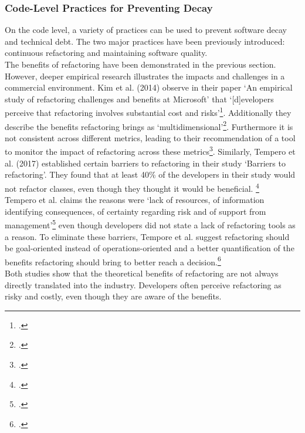 \subsubsection{Code-Level Practices for Preventing Decay}
On the code level, a variety of practices can be used to prevent software decay and technical debt. The two major practices have been previously introduced: continuous refactoring and maintaining software quality.\\
The benefits of refactoring have been demonstrated in the previous section. However, deeper empirical research illustrates the impacts and challenges in a commercial environment.
Kim et al. (2014) observe in their paper `An empirical study of refactoring challenges and benefits at Microsoft' that `[d]evelopers perceive that refactoring involves substantial cost and risks'\footcite[17]{kimEmpiricalStudyRefactoring2014}.
Additionally they describe the benefits refactoring brings as `multidimensional'\footcite[17]{kimEmpiricalStudyRefactoring2014}. Furthermore it is not consistent across different metrics, leading to their recommendation of a tool to monitor the impact of refactoring across these metrics\footcite[17]{kimEmpiricalStudyRefactoring2014}.
Similarly, Tempero et al. (2017) established certain barriers to refactoring in their study `Barriers to refactoring'. They found that at least 40\% of the developers in their study would not refactor classes, even though they thought it would be beneficial. \footcite[60]{temperoBarriersRefactoring2017}\\
Tempero et al. claims the reasons were `lack of resources, of information identifying consequences, of certainty regarding risk and of support from management'\footcite[60]{temperoBarriersRefactoring2017} even though developers did not state a lack of refactoring tools as a reason.
To eliminate these barriers, Tempore et al. suggest refactoring should be goal-oriented instead of operations-oriented and a better quantification of the benefits refactoring should bring to better reach a decision.\footcite[61]{temperoBarriersRefactoring2017}\\
Both studies show that the theoretical benefits of refactoring are not always directly translated into the industry. Developers often perceive refactoring as risky and costly, even though they are aware of the benefits.\\

